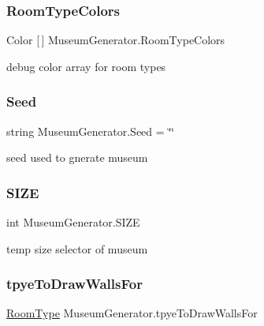 \subsubsection{\texorpdfstring{Room\+Type\+Colors}{RoomTypeColors}}
{\footnotesize\ttfamily Color \mbox{[}$\,$\mbox{]} Museum\+Generator.\+Room\+Type\+Colors}



debug color array for room types 

\mbox{\label{class_museum_generator_a79420e442fa719cbcbceb76df5659209}} 
\subsubsection{\texorpdfstring{Seed}{Seed}}
{\footnotesize\ttfamily string Museum\+Generator.\+Seed = \char`\"{}\char`\"{}}



seed used to gnerate museum 

\mbox{\label{class_museum_generator_a3274560824ac1574cf5b23b70c93f549}} 
\subsubsection{\texorpdfstring{S\+I\+ZE}{SIZE}}
{\footnotesize\ttfamily int Museum\+Generator.\+S\+I\+ZE}



temp size selector of museum 

\mbox{\label{class_museum_generator_aba3c9dafe2095b617ca22049f2b83b5f}} 
\subsubsection{\texorpdfstring{tpye\+To\+Draw\+Walls\+For}{tpyeToDrawWallsFor}}
{\footnotesize\ttfamily \mbox{\hyperlink{_room_8cs_ab540f7414f306325d92272bcef1e34e1}{Room\+Type}} Museum\+Generator.\+tpye\+To\+Draw\+Walls\+For}



